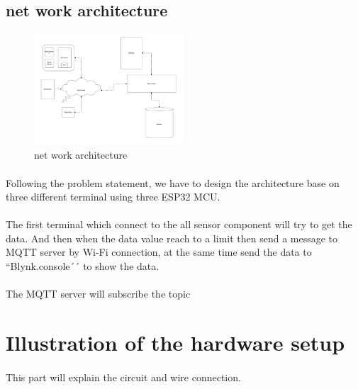 \documentclass[12pt]{article}        %
\begin{document}
    \subsection{net work architecture}\label{subsec:net-work-architecture}

    \begin{figure}[h]
        \centering
        \includegraphics[width=0.5\textwidth]{CircuitLayOut/img}
        \caption{net work architecture}
        \label{fig:figure1}
    \end{figure}

    \paragraph{}
    Following the problem statement, we have to design the architecture base on three different terminal using three ESP32 MCU\@.


    \paragraph{}
    The first terminal which connect to the all sensor component will try to get the data.
    And then when the data value reach to a limit then send a message to MQTT server by Wi-Fi connection, at the
    same time send the data to ``Blynk.console´´ to show the data.


    \paragraph{}
    The MQTT server will subscribe the topic

    \blindtext{}

    \pagebreak
    \section{Illustration of the hardware setup}\label{sec:illustration-of-the-hardware-setup}
    \paragraph{}
    This part will explain the circuit and wire connection.
\end{document}
